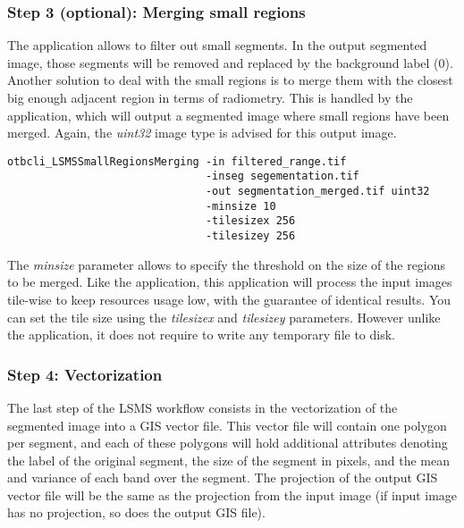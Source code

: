 \subsubsection{Step 3 (optional): Merging small regions}

The  application allows to filter out
small segments. In the output segmented image, those segments will be
removed and replaced by the background label (0). Another solution to
deal with the small regions is to merge them with the closest big
enough adjacent region in terms of radiometry. This is handled by the
 application, which will output a
segmented image where small regions have been merged. Again, the
\emph{uint32} image type is advised for this output image.

\begin{verbatim}
otbcli_LSMSSmallRegionsMerging -in filtered_range.tif
                               -inseg segementation.tif
                               -out segmentation_merged.tif uint32 
                               -minsize 10 
                               -tilesizex 256 
                               -tilesizey 256
\end{verbatim}

The \emph{minsize} parameter allows to specify the threshold on the
size of the regions to be merged. Like the 
application, this application will process the input images tile-wise
to keep resources usage low, with the guarantee of identical
results. You can set the tile size using the \emph{tilesizex} and
\emph{tilesizey} parameters. However unlike the
 application, it does not require to
write any temporary file to disk.

\subsubsection{Step 4: Vectorization}

The last step of the LSMS workflow consists in the vectorization of the
segmented image into a GIS vector file. This vector file will contain
one polygon per segment, and each of these polygons will hold
additional attributes denoting the label of the original segment, the
size of the segment in pixels, and the mean and variance of each band
over the segment. The projection of the output GIS vector file will be
the same as the projection from the input image (if input image has no
projection, so does the output GIS file).

